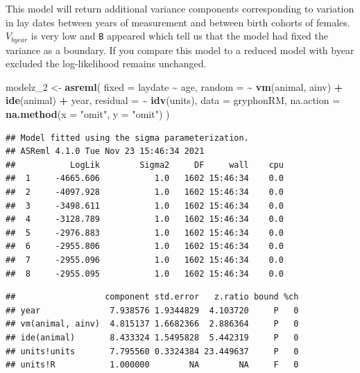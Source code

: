 \documentclass[
  12pt,
]{book}
\newenvironment{Shaded}{\begin{snugshade}}{\end{snugshade}}
\newcommand{\DataTypeTok}[1]{\textcolor[rgb]{0.13,0.29,0.53}{#1}}
\newcommand{\DecValTok}[1]{\textcolor[rgb]{0.00,0.00,0.81}{#1}}
\newcommand{\KeywordTok}[1]{\textcolor[rgb]{0.13,0.29,0.53}{\textbf{#1}}}
\newcommand{\NormalTok}[1]{#1}
\newcommand{\OperatorTok}[1]{\textcolor[rgb]{0.81,0.36,0.00}{\textbf{#1}}}
\newcommand{\StringTok}[1]{\textcolor[rgb]{0.31,0.60,0.02}{#1}}
\begin{document}
This model will return additional variance components corresponding to variation in lay dates between years of measurement and between birth cohorts of females. \(V_{byear}\) is very low and \texttt{B} appeared which tell us that the model had fixed the variance as a boundary. If you compare this model to a reduced model with byear excluded the log-likelihood remains unchanged.

\begin{Shaded}
\begin{Highlighting}[]
\NormalTok{modelz\_}\DecValTok{2}\NormalTok{ \textless{}{-}}\StringTok{ }\KeywordTok{asreml}\NormalTok{(}
  \DataTypeTok{fixed =}\NormalTok{ laydate }\OperatorTok{\textasciitilde{}}\StringTok{ }\NormalTok{age,}
  \DataTypeTok{random =} \OperatorTok{\textasciitilde{}}\StringTok{ }\KeywordTok{vm}\NormalTok{(animal, ainv) }\OperatorTok{+}\StringTok{ }\KeywordTok{ide}\NormalTok{(animal) }\OperatorTok{+}
\StringTok{    }\NormalTok{year,}
  \DataTypeTok{residual =} \OperatorTok{\textasciitilde{}}\StringTok{ }\KeywordTok{idv}\NormalTok{(units),}
  \DataTypeTok{data =}\NormalTok{ gryphonRM,}
  \DataTypeTok{na.action =} \KeywordTok{na.method}\NormalTok{(}\DataTypeTok{x =} \StringTok{"omit"}\NormalTok{, }\DataTypeTok{y =} \StringTok{"omit"}\NormalTok{)}
\NormalTok{)}
\end{Highlighting}
\end{Shaded}

\begin{verbatim}
## Model fitted using the sigma parameterization.
## ASReml 4.1.0 Tue Nov 23 15:46:34 2021
##           LogLik        Sigma2     DF     wall    cpu
##  1     -4665.606           1.0   1602 15:46:34    0.0
##  2     -4097.928           1.0   1602 15:46:34    0.0
##  3     -3498.611           1.0   1602 15:46:34    0.0
##  4     -3128.789           1.0   1602 15:46:34    0.0
##  5     -2976.883           1.0   1602 15:46:34    0.0
##  6     -2955.806           1.0   1602 15:46:34    0.0
##  7     -2955.096           1.0   1602 15:46:34    0.0
##  8     -2955.095           1.0   1602 15:46:34    0.0
\end{verbatim}

\begin{Shaded}
\end{Shaded}

\begin{verbatim}
##                  component std.error   z.ratio bound %ch
## year              7.938576 1.9344829  4.103720     P   0
## vm(animal, ainv)  4.815137 1.6682366  2.886364     P   0
## ide(animal)       8.433324 1.5495828  5.442319     P   0
## units!units       7.795560 0.3324384 23.449637     P   0
## units!R           1.000000        NA        NA     F   0
\end{verbatim}
\end{document}
